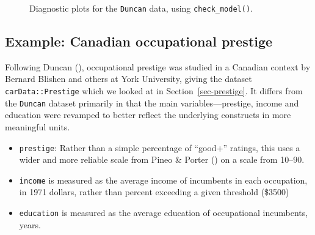 \documentclass[
  letterpaper,
  10pt,
  krantz2]{krantz}
\begin{document}
\begin{figure}[H]


\caption{\label{fig-duncan-check-model}Diagnostic plots for the
\texttt{Duncan} data, using \texttt{check\_model()}.}

\end{figure}%

\subsection{Example: Canadian occupational
prestige}\label{sec-example-prestige}

Following Duncan (), occupational prestige
was studied in a Canadian context by Bernard Blishen and others at York
University, giving the dataset \texttt{carData::Prestige} which we
looked at in Section~\ref{sec-prestige}. It differs from the
\texttt{Duncan} dataset primarily in that the main variables---prestige,
income and education were revamped to better reflect the underlying
constructs in more meaningful units.

\begin{itemize}
\item
  \texttt{prestige}: Rather than a simple percentage of ``good+''
  ratings, this uses a wider and more reliable scale from Pineo \&
  Porter () on a scale from
  10--90.
\item
  \texttt{income} is measured as the average income of incumbents in
  each occupation, in 1971 dollars, rather than percent exceeding a
  given threshold (\$3500)
\item
  \texttt{education} is measured as the average education of
  occupational incumbents, years.
\end{itemize}
\end{document}
